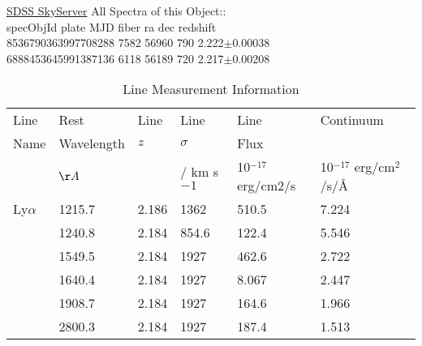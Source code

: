 \documentclass[a4paper,fleqn,usenatbib]{mnras}
\begin{document}
\href{skyserver.sdss.org/dr15/en/tools/explore/summary.aspx?id=1237678579819479655}{SDSS SkyServer}
All Spectra of this Object:: \\
specObjId	plate	MJD	fiber	ra	dec	redshift \\
8536790363997708288	7582	56960	790	2.222$\pm$0.00038\\
6888453645991387136	6118	56189	720	2.217$\pm$0.00208\\




\begin{table*}
  \centering
  \begin{tabular}{l  l  l    lll}
    \hline \hline 
    Line 	    &   Rest	      & Line       & Line	       &	Line			                 &   Continuum \\ 
    Name	    &   Wavelength  &  $z$       & $\sigma$ 	&	Flux			                 & \\
                    &    $\AA $        &              & /  km s$-1$	&     10$^{-17}$ erg/cm$2$/s &  10$^{-17}$ erg/cm$^2$/s/\AA  \\
Ly$\alpha$  &	 1215.7	&	2.186      &	1362	&	510.5		                &	7.224 \\
\nv		    &   1240.8	&	2.184     &	 854.6	&	122.4	                    	&	5.546 \\ 
\civ		    &  1549.5	&	2.184    &	1927	&	462.6		                &	2.722 \\ 
\heii	    &	 1640.4	&	2.184    &	1927	&    	  8.067	                   	&	2.447 \\  
\ciii 	    &	 1908.7	&	2.184    &	1927	&	164.6	                   	&	1.966  \\ 
\mgii	    &	 2800.3	&	2.184   & 	1927	&	187.4	                   	&	1.513  \\
   \hline \hline   
  \end{tabular}
  \caption{Line Measurement Information}
 \label{tab:line_values}
\end{table*}
\end{document}
